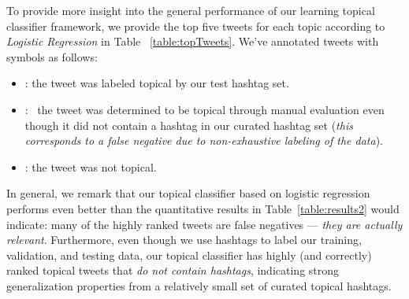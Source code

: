 To provide more insight into the general performance of our learning
topical classifier framework, we provide the top five tweets for
each topic according to \textit{Logistic Regression} in Table
~\ref{table:topTweets}.  We've annotated tweets with symbols as follows:
\begin{itemize}
\item \checkmark: \; the tweet was labeled topical by our test hashtag set.
\item \starmark:\ \; the tweet was determined to be topical through manual evaluation
even though it did not contain a hashtag in our curated hashtag set (\emph{this corresponds
to a false negative due to non-exhaustive labeling of the data}).
\item \xmark: \; the tweet was not topical.
\end{itemize}  
In general, we remark that our topical classifier based on
logistic regression performs even better than the quantitative results
in Table~\ref{table:results2} would indicate: many of the highly
ranked tweets are false negatives --- \emph{they are actually relevant}.
Furthermore, even though we use hashtags to label our
training, validation, and testing data, our topical classifier has
highly (and correctly) ranked topical tweets that \emph{do not contain
hashtags}, indicating strong generalization properties from a
relatively small set of curated topical hashtags.


